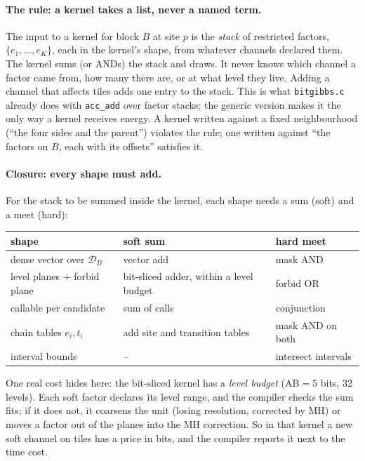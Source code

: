 \documentclass[11pt]{article}
\newcommand{\1}{\mathds{1}}
\newcommand{\Dom}{\mathcal{D}}
\begin{document}
\paragraph{The rule: a kernel takes a list, never a named term.} The input to a
kernel for block $B$ at site $p$ is the \emph{stack} of restricted factors,
$\{e_1, \dots, e_K\}$, each in the kernel's shape, from whatever channels
declared them. The kernel sums (or ANDs) the stack and draws. It never knows
which channel a factor came from, how many there are, or at what level they
live. Adding a channel that affects tiles adds one entry to the stack. This
is what \texttt{bitgibbs.c} already does with \texttt{acc\_add} over factor
stacks; the generic version makes it the only way a kernel receives energy.
A kernel written against a fixed neighbourhood (``the four sides and the
parent'') violates the rule; one written against ``the factors on $B$, each
with its offsets'' satisfies it.

\paragraph{Closure: every shape must add.} For the stack to be summed inside
the kernel, each shape needs a sum (soft) and a meet (hard):
\begin{center}
\small
\begin{tabular}{@{}lll@{}}
\toprule
shape & soft sum & hard meet \\
\midrule
dense vector over $\Dom_B$ & vector add & mask AND \\
level planes + forbid plane & bit-sliced adder, within a level budget & forbid OR \\
callable per candidate & sum of calls & conjunction \\
chain tables $e_i, t_i$ & add site and transition tables & mask AND on both \\
interval bounds & -- & intersect intervals \\
\bottomrule
\end{tabular}
\end{center}
One real cost hides here: the bit-sliced kernel has a \emph{level budget}
($\mathrm{AB} = 5$ bits, 32 levels). Each soft factor declares its level range,
and the compiler checks the sum fits; if it does not, it coarsens the unit
(losing resolution, corrected by MH) or moves a factor out of the planes into
the MH correction. So in that kernel a new soft channel on tiles has a price in
bits, and the compiler reports it next to the time cost.
\end{document}
